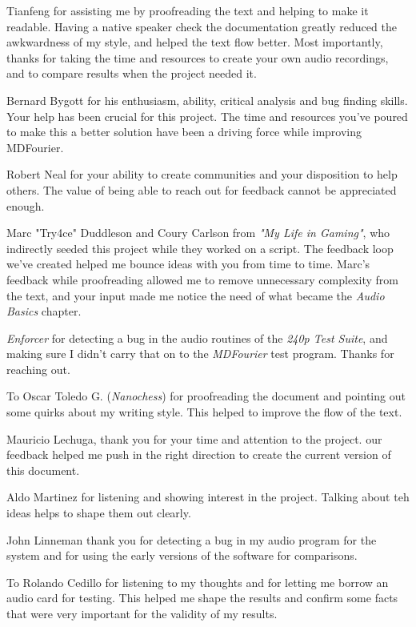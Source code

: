 \documentclass[10pt,a4paper]{report}
\begin{document}
\begin{appendices}
Tianfeng for assisting me by proofreading the text and helping to make it readable. Having a native speaker check the documentation greatly reduced the awkwardness of my style, and helped the text flow better. Most importantly, thanks for taking the time and resources to create your own audio recordings, and to compare results when the project needed it.

Bernard Bygott for his enthusiasm, ability, critical analysis and bug finding skills. Your help has been crucial for this project. The time and resources you've poured to make this a better solution have been a driving force while improving MDFourier.

Robert Neal for your ability to create communities and your disposition to help others. The value of being able to reach out for feedback cannot be appreciated enough.

Marc "Try4ce" Duddleson and Coury Carlson from \textit{"My Life in Gaming"}, who indirectly seeded this project while they worked on a script. The feedback loop we've created helped me bounce ideas with you from time to time. Marc's feedback while proofreading allowed me to remove unnecessary complexity from the text, and your input made me notice the need of what became the \textit{Audio Basics} chapter.

\textit{Enforcer} for detecting a bug in the audio routines of the \textit{240p Test Suite}, and making sure I didn't carry that on to the \textit{MDFourier} test program. Thanks for reaching out.

To  Oscar Toledo G. (\textit{Nanochess}) for proofreading the document and pointing out some quirks about my writing style. This helped to improve the flow of the text.

Mauricio Lechuga, thank you for your time and attention to the project. our feedback helped me push in the right direction to create the current version of this document. 

Aldo Martinez for listening and showing interest in the project. Talking about teh ideas helps to shape them out clearly.

John Linneman thank you for detecting a bug in my audio program for the system and for using the early versions of the software for comparisons.

To Rolando Cedillo for listening to my thoughts and for letting me borrow an audio card for testing. This helped me shape the results and confirm some facts that were very important for the validity of my results.


\end{appendices}
\end{document}
